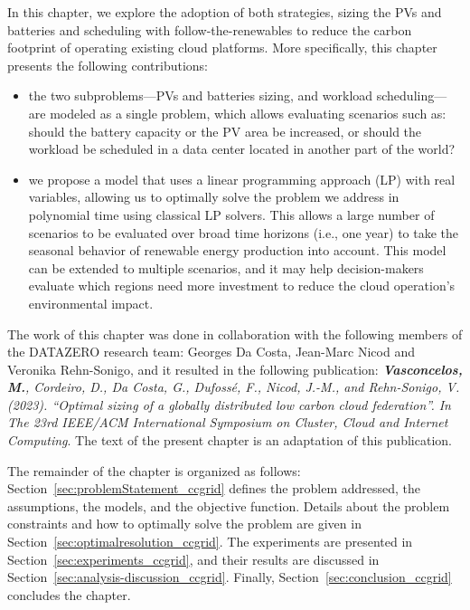 In this chapter, we explore the adoption of both strategies, sizing the PVs and batteries and scheduling with follow-the-renewables to reduce the carbon footprint of operating existing cloud platforms. More specifically, this chapter presents the following contributions:


\begin{itemize}
    
    \item the two subproblems---PVs and batteries sizing, and workload scheduling---are modeled as a single problem, which allows evaluating scenarios such as: should the battery capacity or the PV area be increased, or should the workload be scheduled in a data center located in another part of the world?
    
    \item we propose a model that uses a linear programming approach (LP) with real variables, allowing us to optimally solve the problem we address in polynomial time using classical LP solvers. This allows a large number of scenarios to be evaluated over broad time horizons (i.e., one year) to take the seasonal behavior of renewable energy production into account. This model can be extended to multiple scenarios, and it may help decision-makers evaluate which regions need more investment to reduce the cloud operation's environmental impact.

\end{itemize}



The work of this chapter was done in collaboration with the following members of the DATAZERO\cite{datazero} research team: Georges Da Costa, Jean-Marc Nicod and Veronika Rehn-Sonigo, and it resulted in the following publication:  \textit{\textbf{Vasconcelos, M.}, Cordeiro, D., Da Costa, G., Dufossé, F., Nicod, J.-M., and Rehn-Sonigo, V. (2023). ``Optimal sizing of a globally distributed low carbon cloud federation''. In The 23rd IEEE/ACM International Symposium on Cluster, Cloud and Internet Computing}. The text of the present chapter is an adaptation of this publication.


The remainder of the chapter is organized as follows: Section~\ref{sec:problemStatement_ccgrid} defines the problem addressed, the assumptions, the models, and the objective function. Details about the problem constraints and how to optimally solve the problem are given in Section~\ref{sec:optimalresolution_ccgrid}. The experiments are presented in Section~\ref{sec:experiments_ccgrid}, and their results are discussed in Section~\ref{sec:analysis-discussion_ccgrid}. Finally, Section~\ref{sec:conclusion_ccgrid} concludes the chapter. 



